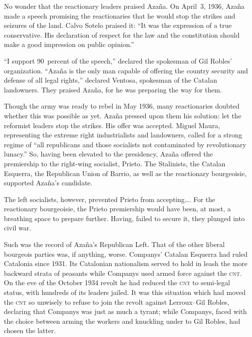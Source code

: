 No wonder that the reactionary leaders praised Azaña. On April~3, 1936, Azaña made a speech promising the reactionaries that he would stop the strikes and seizures of the land. Calvo Sotelo praised it: ``It was the expression of a true conservative. His declaration of respect for the law and the constitution should make a good impression on public opinion.''

``I support 90~percent of the speech,'' declared the spokesman of Gil Robles’ organization. ``Azaña is the only man capable of offering the country security and defense of all legal rights,'' declared Ventosa, spokesman of the Catalan landowners. They praised Azaña, for he was preparing the way for them.

Though the army was ready to rebel in May 1936, many reactionaries doubted whether this was possible as yet. Azaña pressed upon them his solution: let the reformist leaders stop the strikes. His offer was accepted. Miguel Maura, representing the extreme right industrialists and landowners, called for a strong regime of ``all republicans and those socialists not contaminated by revolutionary lunacy.'' So, having been elevated to the presidency, Azaña offered the premiership to the right-wing socialist, Prieto. The Stalinists, the Catalan Esquerra{\indexEsquerra}, the Republican Union of Barrio, as well as the reactionary bourgeoisie, supported Azaña’s candidate.

The left socialists, however, prevented Prieto{\indexIPrieto} from accepting\ldots. For the reactionary bourgeoisie, the Prieto premiership would have been, at most, a breathing space to prepare further. Having, failed to secure it, they plunged into civil war.

Such was the record of Azaña’s Republican Left. That of the other liberal bourgeois parties was, if anything, worse. Companys’ Catalan Esquerra had ruled Catalonia since 1931.{\indexLCompanys} Its Catalonian nationalism served to hold in leash the more backward strata of peasants while Companys used armed force against the \textsc{cnt}. On the eve of the October 1934 revolt he had reduced the \textsc{cnt} to semi-legal status, with hundreds of its leaders jailed. It was this situation which had moved the \textsc{cnt} so unwisely to refuse to join the revolt against Lerroux--Gil Robles, declaring that Companys was just as much a tyrant; while Companys, faced with the choice between arming the workers and knuckling under to Gil Robles, had chosen the latter.


